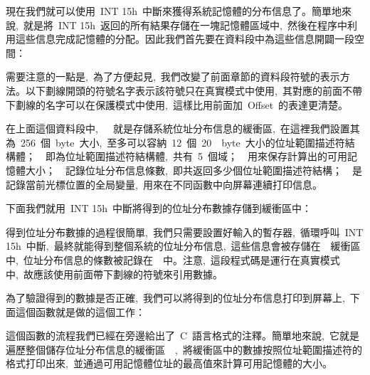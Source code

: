 現在我們就可以使用~INT 15h~中斷來獲得系統記憶體的分布信息了。簡單地來說,~就是將~INT 15h~返回的所有結果存儲在一塊記憶體區域中,~然後在程序中利用這些信息完成記憶體的分配。因此我們首先要在資料段中為這些信息開闢一段空間：


需要注意的一點是,~為了方便起見,~我們改變了前面章節的資料段符號的表示方法。以下劃線開頭的符號名字表示該符號只在真實模式中使用,~其對應的前面不帶下劃線的名字可以在保護模式中使用,~這樣比用前面加~Offset~的表達更清楚。

在上面這個資料段中,~~~就是存儲系統位址分布信息的緩衝區,~在這裡我們設置其為~256~個~byte~大小,~至多可以容納~12~個~20~~byte~大小的位址範圍描述符結構體；~~即為位址範圍描述符結構體,~共有~5~個域；~~用來保存計算出的可用記憶體大小；~~記錄位址分布信息條數,~即共返回多少個位址範圍描述符結構；~~是記錄當前光標位置的全局變量,~用來在不同函數中向屏幕連續打印信息。

下面我們就用~INT 15h~中斷將得到的位址分布數據存儲到緩衝區中：


得到位址分布數據的過程很簡單,~我們只需要設置好輸入的暫存器,~循環呼叫~INT 15h~中斷,~最終就能得到整個系統的位址分布信息,~這些信息會被存儲在~~緩衝區中,~位址分布信息的條數被記錄在~~中。注意,~這段程式碼是運行在真實模式中,~故應該使用前面帶下劃線的符號來引用數據。

為了驗證得到的數據是否正確,~我們可以將得到的位址分布信息打印到屏幕上,~下面這個函數就是做的這個工作：


這個函數的流程我們已經在旁邊給出了~C~語言格式的注釋。簡單地來說,~它就是遍歷整個儲存位址分布信息的緩衝區~~,~將緩衝區中的數據按照位址範圍描述符的格式打印出來,~並通過可用記憶體位址的最高值來計算可用記憶體的大小。

